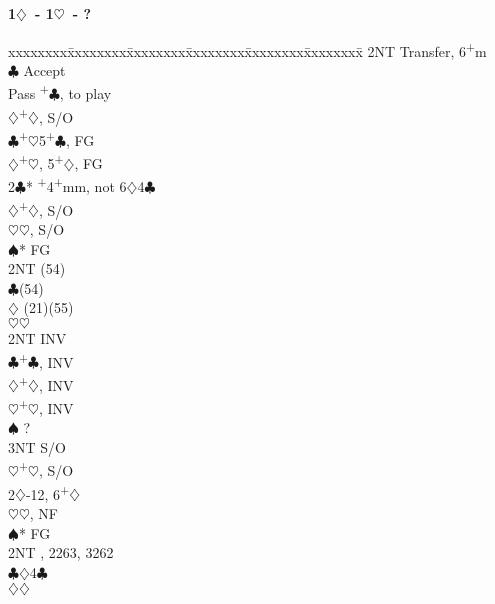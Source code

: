 \documentclass[10pt]{article}
\renewcommand{\c}{$\clubsuit$}
\renewcommand{\d}{$\diamondsuit$}
\newcommand{\h}{$\heartsuit$}
\newcommand{\s}{$\spadesuit$}
\newcommand{\p}{\textsuperscript{+}}
\newenvironment{bidtable}[1][]
{\textbf{#1}
  \begin{adjustwidth}{1em}{}
    \addvspace{2pt}
    \begin{tabbing}
      xxxxxxxx\=xxxxxxxx\=xxxxxxxx\=xxxxxxxx\=xxxxxxxx\=xxxxxxxx\=\kill}
{\end{tabbing}\end{adjustwidth}\bigskip}%
\begin{document}
\begin{multicols*}{2}
\begin{bidtable}[1\d\ - 1\h\ - ?]
     \> 2NT  \> Transfer, 6\p m                         \\
     \>      \c \> Accept                           \\
     \>      \>     \> Pass \p\c, to play           \\
     \>      \>     \d  {}\p\d, S/O               \\
     \c  {}\p\h 5\p\c, FG                         \\
     \d  {}\p\h, 5\p\d, FG                        \\
2\c* {}\p 4\p mm, not 6\d 4\c                         \\
     \d  {}\p\d, S/O                              \\
     \h  {}\h, S/O                                \\
     \s* \> FG                                      \\
     \>      \> 2NT (54)                           \\
     \>      \c {}(54)                           \\
     \>      \d \> (21)(55)                         \\
     \>      \h {}\h                              \\
     \> 2NT  \> INV                                     \\
     \c  {}\p\c, INV                              \\
     \d  {}\p\d, INV                              \\
     \h  {}\p\h, INV                              \\
     \s  \> ?                                       \\
     \> 3NT  \> S/O                                     \\
     \h  {}\p\h, S/O                              \\
2\d  {}-12, 6\p\d                                    \\
     \h  {}\h, NF                                 \\
     \s* \> FG                                      \\
     \>      \> 2NT , 2263, 3262                 \\
     \>      \c {}\d 4\c                          \\
     \>      \d {}\d                              \\

\end{bidtable}
\end{multicols*}
\end{document}
